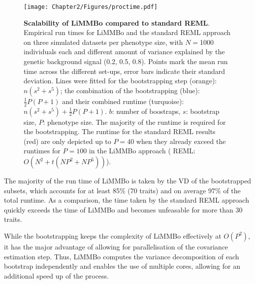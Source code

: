 \begin{figure}[H]
	\centering
	\texttt{[image: Chapter2/Figures/proctime.pdf]}
	\caption[\textbf{Scalability of LiMMBo  compared to standard REML.}]{\textbf{Scalability of LiMMBo  compared to standard REML}. Empirical run times for LiMMBo and the standard REML approach on three simulated datasets per phenotype size, with \(N=\)\num{1000} individuals each and different amount of variance explained by the genetic background signal (\num{0.2}, \num{0.5}, \num{0.8}). Points mark the mean run time across the different set-ups, error bars indicate their standard deviation. Lines were fitted for the bootstrapping step (orange): \(n(s^2 + s^5)\); the combination of the bootstrapping (blue): \(\frac{1}{2}P(P+1)\) and their combined runtime (turquoise):  \(n(s^2 + s^5) + \frac{1}{2}P(P+1)\). \(b\): number of boostraps, \(s\): bootstrap size, \(P\): phenotype size. The majority of the runtime is required for the bootstrapping. The runtime for the standard REML results (red) are only depicted up to \(P=40\) when they already exceed the runtimes for \(P=100\) in the LiMMBo approach ( REML: \(O(N^2 + t(NP^2 + NP^5))\)).}
	 	\label{fig:proctime}
\end{figure}
%
The majority of the run time of LiMMBo is taken by the VD of the bootstrapped subsets, which accounts for at least \num{85}\%  (\num{70} traits) and on average \num{97}\%  of the total runtime. As a comparison, the time taken by the standard REML approach quickly exceeds the time of LiMMBo and becomes unfeasable for more than \num{30} traits. 
 
While the bootstrapping keeps the complexity of LiMMBo effectively at \(O(P^2)\), it has the major advantage of allowing for parallelisation of the covariance estimation step. Thus, LiMMBo computes the variance decomposition of each bootstrap independently and enables the use of multiple cores, allowing for an additional speed up of the process. 


